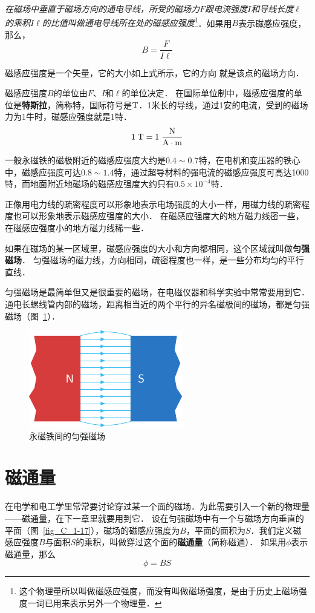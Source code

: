 \textit{在磁场中垂直于磁场方向的通电导线，所受的磁场力$F$跟电流强度$I$和导线长度$\ell$的乘积$I\ell$的比值叫做通电导线所在处的磁感应强度}\footnote{这个物理量所以叫做磁感应强度，而没有叫做磁场强度，是由于历史上磁场强度一词已用来表示另外一个物理量．}．如果用$B$表示磁感应强度，那么，
\[B=\frac{F}{I\ell}\]

磁感应强度是一个矢量，它的大小如上式所示，它的方向
就是该点的磁场方向．

磁感应强度$B$的单位由$F$、$I$和$\ell$的单位决定．
在国际单位制中，磁感应强度的单位是\textbf{特斯拉}，简称特，国际符号是$ \text{T} $．1米长的导线，通过1安的电流，受到的磁场力为1牛时，磁感应强度就是1特．
\[1\;\text{T} =1 \; \frac{\text{N}}{\text{A}\cdot\text{m}}\]

一般永磁铁的磁极附近的磁感应强度大约是$0.4 \sim 0.7$特，在电机和变压器的铁心中，磁感应强度可达$0.8 \sim 1.4$特，通过超导材料的强电流的磁感应强度可高达1000特，而地面附近地磁场的磁感应强度大约只有$0.5\times 10^{-4}$特．

正像用电力线的疏密程度可以形象地表示电场强度的大小一样，用磁力线的疏密程度也可以形象地表示磁感应强度的大小．
在磁感应强度大的地方磁力线密一些，在磁感应强度小的地方磁力线稀一些．

如果在磁场的某一区域里，磁感应强度的大小和方向都相同，这个区域就叫做\textbf{匀强磁场}．
匀强磁场的磁力线，方向相同，疏密程度也一样，是一些分布均匀的平行直线．

匀强磁场是最简单但又是很重要的磁场，在电磁仪器和科学实验中常常要用到它．
通电长螺线管内部的磁场，距离相当近的两个平行的异名磁极间的磁场，都是匀强磁场（图~\ref{fig_C_1-16}）．

\begin{figure}[htbp]
    \centering
    \includegraphics{fig/C/1-16.pdf}
    \caption{永磁铁间的匀强磁场}\label{fig_C_1-16}
\end{figure}

\section{磁通量}
在电学和电工学里常常要讨论穿过某一个面的磁场．为此需要引入一个新的物理量——磁通量，在下一章里就要用到它．
设在匀强磁场中有一个与磁场方向垂直的平面（图~\ref{fig_C_1-17}），磁场的磁感应强度为$B$，平面的面积为$S$．我们定义磁感应强度$B$与面积$S$的乘积，叫做穿过这个面的\textbf{磁通量}（简称磁通）．
如果用$\phi$表示磁通量，那么
\[\phi=BS \]

